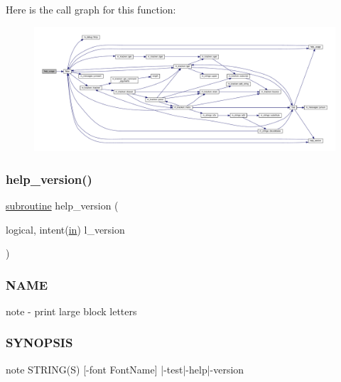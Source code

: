 Here is the call graph for this function\+:
\nopagebreak
\begin{figure}[H]
\begin{center}
\leavevmode
\includegraphics[width=350pt]{note_8f90_a3e09a3b52ee8fb04eeb93fe5761626a8_cgraph}
\end{center}
\end{figure}
\mbox{\label{note_8f90_a39c21619b08a3c22f19e2306efd7f766}} 
\subsubsection{\texorpdfstring{help\+\_\+version()}{help\_version()}}
{\footnotesize\ttfamily \hyperlink{M__stopwatch_83_8txt_acfbcff50169d691ff02d4a123ed70482}{subroutine} help\+\_\+version (\begin{DoxyParamCaption}\item[{logical, intent(\hyperlink{M__journal_83_8txt_afce72651d1eed785a2132bee863b2f38}{in})}]{l\+\_\+version }\end{DoxyParamCaption})}



\subsubsection*{N\+A\+ME}

note -\/ print large block letters 

\subsubsection*{S\+Y\+N\+O\+P\+S\+IS}

\begin{DoxyVerb} note STRING(S) [-font FontName] |-test|-help|-version
\end{DoxyVerb}


